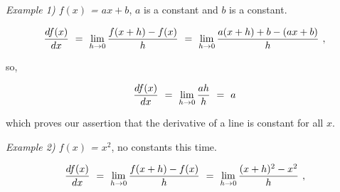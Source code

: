 \documentclass{article}
\begin{document}
\textit{Example 1)  \begin{math} f(x) \end{math} = \begin{math} a x + b \end{math}},  \begin{math} a \end{math} is a constant and \begin{math} b \end{math} is a constant.

\begin{equation} \label{eq:307}
\frac{df(x)}{dx} \hspace{0.125cm} = \hspace{0.125cm} \lim_{h\to0} \frac{f(x + h) - f(x)}{h} \hspace{0.125cm} = \hspace{0.125cm} \lim_{h\to0} \frac{a(x + h) + b - (a x + b)}{h} \hspace{0.125cm} ,
\end{equation}

so, 

\begin{equation} \label{eq:308}
\frac{df(x)}{dx} \hspace{0.125cm} = \hspace{0.125cm} \lim_{h\to0} \frac{ah}{h} \hspace{0.125cm} = \hspace{0.125cm} a
\end{equation}

which proves our assertion that the derivative of a line is constant for all  \begin{math} x \end{math}. 

\textit{Example 2)  \begin{math} f(x) \end{math} = \begin{math} x^2 \end{math}}, no constants this time.

\begin{equation} \label{eq:309}
\frac{df(x)}{dx} \hspace{0.125cm} = \hspace{0.125cm} \lim_{h\to0} \frac{f(x + h) - f(x)}{h} \hspace{0.125cm} = \hspace{0.125cm} \lim_{h\to0} \frac{(x + h)^2 - x^2}{h} \hspace{0.125cm} ,
\end{equation}
\end{document}
